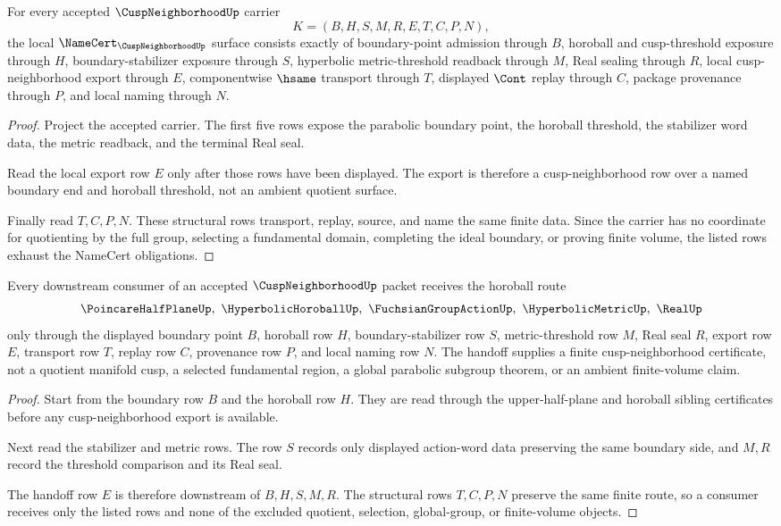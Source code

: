 \begin{theorem}
\label{thm:cusp-neighborhood-namecert-obligations}
For every accepted $\CuspNeighborhoodUp$ carrier
$$
K=(B,H,S,M,R,E,T,C,P,N),
$$
the local $\NameCert_{\CuspNeighborhoodUp}$ surface consists exactly of boundary-point admission through $B$, horoball and cusp-threshold exposure through $H$, boundary-stabilizer exposure through $S$, hyperbolic metric-threshold readback through $M$, Real sealing through $R$, local cusp-neighborhood export through $E$, componentwise $\hsame$ transport through $T$, displayed $\Cont$ replay through $C$, package provenance through $P$, and local naming through $N$.
\end{theorem}
\begin{proof}
Project the accepted carrier. The first five rows expose the parabolic boundary point, the horoball threshold, the stabilizer word data, the metric readback, and the terminal Real seal.

Read the local export row $E$ only after those rows have been displayed. The export is therefore a cusp-neighborhood row over a named boundary end and horoball threshold, not an ambient quotient surface.

Finally read $T,C,P,N$. These structural rows transport, replay, source, and name the same finite data. Since the carrier has no coordinate for quotienting by the full group, selecting a fundamental domain, completing the ideal boundary, or proving finite volume, the listed rows exhaust the NameCert obligations.
\end{proof}

\begin{theorem}
\label{thm:cusp-neighborhood-horoball-handoff}
Every downstream consumer of an accepted $\CuspNeighborhoodUp$ packet receives the horoball route
$$
\PoincareHalfPlaneUp,\ \HyperbolicHoroballUp,\ \FuchsianGroupActionUp,\ \HyperbolicMetricUp,\ \RealUp
$$
only through the displayed boundary point $B$, horoball row $H$, boundary-stabilizer row $S$, metric-threshold row $M$, Real seal $R$, export row $E$, transport row $T$, replay row $C$, provenance row $P$, and local naming row $N$. The handoff supplies a finite cusp-neighborhood certificate, not a quotient manifold cusp, a selected fundamental region, a global parabolic subgroup theorem, or an ambient finite-volume claim.
\end{theorem}
\begin{proof}
Start from the boundary row $B$ and the horoball row $H$. They are read through the upper-half-plane and horoball sibling certificates before any cusp-neighborhood export is available.

Next read the stabilizer and metric rows. The row $S$ records only displayed action-word data preserving the same boundary side, and $M,R$ record the threshold comparison and its Real seal.

The handoff row $E$ is therefore downstream of $B,H,S,M,R$. The structural rows $T,C,P,N$ preserve the same finite route, so a consumer receives only the listed rows and none of the excluded quotient, selection, global-group, or finite-volume objects.
\end{proof}

